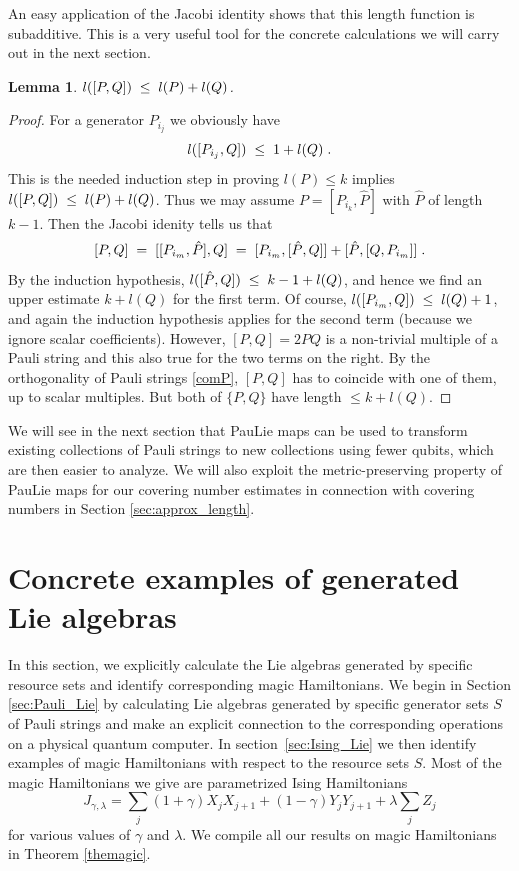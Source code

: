 \documentclass[12pt, a4-paper]{amsart}
\numberwithin{equation}{section}
\newcommand{\kl}{\pl \le \pl}
\newcommand{\lel}{\pl = \pl}
\newcommand{\pl}{\hspace{.1cm}}
\newtheorem{lemma}{Lemma}[section]
\begin{document}
An easy application of the Jacobi identity shows that this length function is subadditive. This is a very useful tool for the concrete calculations we will carry out in the next section. 

\begin{lemma}\label{additive} $l([P,Q])\kl l(P)+l(Q)$.
\end{lemma}

\begin{proof} For a generator $P_{i_j}$ we obviously have
  \[ l([P_{i_j},Q])\kl 1+ l(Q) \pl. \]
This is the needed induction step in proving $l(P)\le k$ implies $l([P,Q])\kl l(P)+l(Q)$. Thus we may assume $P=[P_{i_k},\hat{P}]$ with $\hat{P}$ of length $k-1$. Then the Jacobi idenity tells us that 
 \[ [P,Q] \lel [[P_{i_m},\hat{P}],Q] 
 \lel [P_{i_m},[\hat{P},Q]]+ [\hat{P},[Q,P_{i_m}] ]\pl. \] 
By the induction hypothesis, $l([\hat{P},Q])\kl k-1+l(Q)$, and hence we find an upper estimate $k+l(Q)$ for the first term. Of course, $l([P_{i_m},Q])\kl l(Q)+1$, and again the induction hypothesis applies for the second term (because we ignore scalar coefficients). However, $[P,Q]=2PQ$ is a non-trivial multiple of a Pauli string and this also true for the two terms on the right. By the orthogonality of Pauli strings \eqref{comP}, $[P,Q]$ has to coincide with one of them, up to scalar multiples. But both of $\{P,Q\}$ have length $\le k+l(Q)$. 
\end{proof}

We will see in the next section that PauLie maps can be used to transform existing collections of Pauli strings to new collections using fewer qubits, which are then easier to analyze. We will also exploit the metric-preserving property of PauLie maps for our covering number estimates in connection with covering numbers in Section \ref{sec:approx_length}.  

\section{Concrete examples of generated Lie algebras} \label{sec:generated-Lie-Alg}

In this section, we explicitly calculate the Lie algebras generated by specific resource sets and identify corresponding magic Hamiltonians. We begin in Section \ref{sec:Pauli_Lie} by calculating Lie algebras generated by specific generator sets $S$ of Pauli strings and make an explicit connection to the corresponding operations on a physical quantum computer. In section~\ref{sec:Ising_Lie} we then identify examples of magic Hamiltonians with respect to the resource sets $S$. Most of the magic Hamiltonians we give are parametrized Ising Hamiltonians 
\begin{equation}
    J_{\gamma, \lambda} = \sum_j (1+\gamma) X_j X_{j+1} + (1-\gamma)Y_j Y_{j+1} + \lambda \sum_j Z_j
\end{equation}
for various values of $\gamma$ and $\lambda$. We compile all our results on magic Hamiltonians in Theorem \ref{themagic}.
\end{document}

